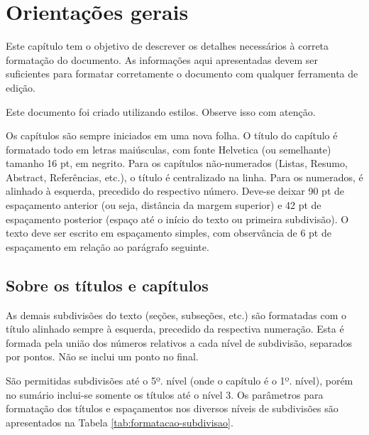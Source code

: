 \chapter{Orientações gerais}

Este capítulo tem o objetivo de descrever os detalhes necessários à correta formatação do documento. As informações aqui apresentadas devem ser suficientes para formatar corretamente o documento com qualquer ferramenta de edição.

Este documento foi criado utilizando estilos. Observe isso com atenção.

Os capítulos são sempre iniciados em uma nova folha. O título do capítulo é formatado todo em letras maiúsculas, com fonte Helvetica (ou semelhante) tamanho 16 pt, em negrito. Para os capítulos não-numerados (Listas, Resumo, Abstract, Referências, etc.), o título é centralizado na linha. Para os numerados, é alinhado à esquerda, precedido do respectivo número. Deve-se deixar 90 pt de espaçamento anterior (ou seja, distância da margem superior) e 42 pt de espaçamento posterior (espaço até o início do texto ou primeira subdivisão). O texto deve ser escrito em espaçamento simples, com observância de 6 pt de espaçamento em relação ao parágrafo seguinte.

\section{Sobre os títulos e capítulos}

As demais subdivisões do texto (seções, subseções, etc.) são formatadas com o título alinhado sempre à esquerda, precedido da respectiva numeração. Esta é formada pela união dos números relativos a cada nível de subdivisão, separados por pontos. Não se inclui um ponto no final.

São permitidas subdivisões até o 5º. nível (onde o capítulo é o 1º. nível), porém no sumário inclui-se somente os títulos até o nível 3. Os parâmetros para formatação dos títulos e espaçamentos nos diversos níveis de subdivisões são apresentados na Tabela \ref{tab:formatacao-subdivisao}.

